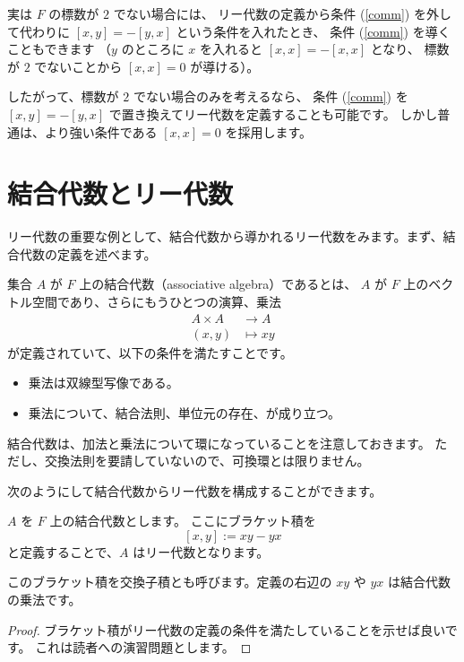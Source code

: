 \documentclass{ltjsarticle}
\begin{document}
実は $F$ の標数が $2$ でない場合には、
リー代数の定義から条件 (\ref{comm}) を外して代わりに $[x, y] = -[y, x]$ という条件を入れたとき、
条件 (\ref{comm}) を導くこともできます
（$y$ のところに $x$ を入れると $[x, x] = -[x, x]$ となり、
標数が $2$ でないことから $[x, x] = 0$ が導ける）。

したがって、標数が $2$ でない場合のみを考えるなら、
条件 (\ref{comm}) を $[x, y] = -[y, x]$ で置き換えてリー代数を定義することも可能です。
しかし普通は、より強い条件である $[x, x] = 0$ を採用します。

\section{結合代数とリー代数}

リー代数の重要な例として、結合代数から導かれるリー代数をみます。まず、結合代数の定義を述べます。

\begin{definition}[結合代数]
    集合 $A$ が $F$ 上の結合代数（associative algebra）であるとは、
    $A$ が $F$ 上のベクトル空間であり、さらにもうひとつの演算、乗法
    \begin{align*}
        A \times A & \to A      \\
        (x, y)     & \mapsto xy
    \end{align*}
    が定義されていて、以下の条件を満たすことです。
    \begin{itemize}
        \item 乗法は双線型写像である。
        \item 乗法について、結合法則、単位元の存在、が成り立つ。
    \end{itemize}
\end{definition}

結合代数は、加法と乗法について環になっていることを注意しておきます。
ただし、交換法則を要請していないので、可換環とは限りません。

次のようにして結合代数からリー代数を構成することができます。

\begin{example}[結合代数から導かれるリー代数] \label{commutator}
    $A$ を $F$ 上の結合代数とします。
    ここにブラケット積を
    \[
        [x, y] := xy - yx
    \]
    と定義することで、$A$ はリー代数となります。
\end{example}

このブラケット積を交換子積とも呼びます。定義の右辺の $xy$ や $yx$ は結合代数の乗法です。

\begin{proof}
    ブラケット積がリー代数の定義の条件を満たしていることを示せば良いです。
    これは読者への演習問題とします。
\end{proof}
\end{document}
